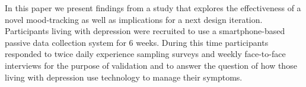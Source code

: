 In this paper we present findings from a study
that explores the effectiveness of a novel mood-tracking 
as well as implications for a next design iteration.
Participants living with depression were recruited to 
use a smartphone-based passive data collection system 
for 6 weeks.  During this time participants
responded to twice daily experience sampling surveys
and weekly face-to-face interviews for the purpose
of validation and to answer the question 
of how those living with depression use technology
to manage their symptoms.